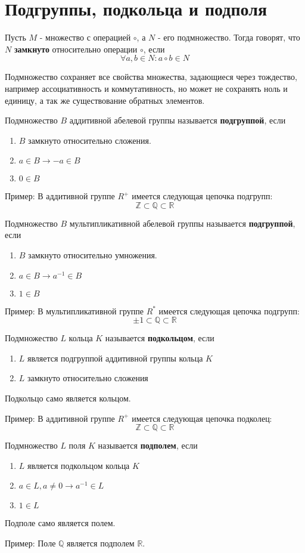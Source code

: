 \section{Подгруппы, подкольца и подполя}
Пусть $M$ - множество с операцией $\circ$, а $N$ - его подмножество. Тогда говорят, что $N$ \textbf{замкнуто} относительно операции $\circ$, если
$$
\forall a, b \in N : a \circ b \in N
$$

Подмножество сохраняет все свойства множества, задающиеся через тождество, например ассоциативность и коммутативность, но может не сохранять ноль и единицу, а так же существование обратных элементов.

Подмножество $B$ аддитивной абелевой группы называется \textbf{подгруппой}, если 
\begin{enumerate}
	\item $B$ замкнуто относительно сложения.
	\item $a \in B \rightarrow -a \in B$
	\item $0 \in B$
\end{enumerate}

Пример: В аддитивной группе $R^+$ имеется следующая цепочка подгрупп:
$$
\mathbb{Z} \subset \mathbb{Q} \subset \mathbb{R}
$$

Подмножество $B$ мультипликативной абелевой группы называется \textbf{подгруппой}, если 
\begin{enumerate}
	\item $B$ замкнуто относительно умножения.
	\item $a \in B \rightarrow a^{-1} \in B$
	\item $1 \in B$
\end{enumerate}

Пример: В мультипликативной группе $R^*$ имеется следующая цепочка подгрупп:
$$
{\pm1} \subset \mathbb{Q} \subset \mathbb{R}
$$

Подмножество $L$ кольца $K$ называется \textbf{подкольцом}, если
\begin{enumerate}
	\item $L$ является подгруппой аддитивной группы кольца $K$
	\item $L$ замкнуто относительно сложения
\end{enumerate}

Подкольцо само является кольцом.

Пример: В аддитивной группе $R^+$ имеется следующая цепочка подколец:
$$
\mathbb{Z} \subset \mathbb{Q} \subset \mathbb{R}
$$

Подмножество $L$ поля $K$ называется \textbf{подполем}, если
\begin{enumerate}
	\item $L$ является подкольцом кольца $K$
	\item $a \in L, a \neq 0 \rightarrow a^{-1} \in L$
	\item $1 \in L$
\end{enumerate}

Подполе само является полем.

Пример: Поле $\mathbb{Q}$ является подполем $\mathbb{R}$.